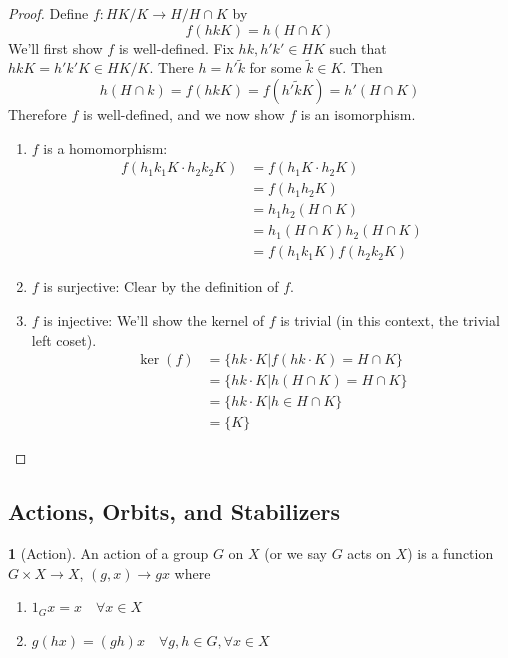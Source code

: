 \documentclass[12pt]{article}
\theoremstyle{definition}
\newtheorem{definition}{\color{NavyBlue}{\textbf{Definition}}}
\theoremstyle{definition}
\begin{document}
\begin{proof}
Define $f : HK / K \to H / H \cap K$ by 
\begin{equation}
	f(hk K) = h (H \cap K)
\end{equation}
We'll first show $f$ is well-defined. Fix $hk, h'k' \in HK$ such that $hk K = h'k'K \in HK/K$. There $h = h'\tilde{k}$ for some $\tilde{k} \in K$. Then
\begin{equation}
	h (H \cap k) = f(hk K) = f(h' \tilde{k} K) = h' (H \cap K)
\end{equation}
Therefore $f$ is well-defined, and we now show $f$ is an isomorphism.
\begin{enumerate}
	\item $f$ is a homomorphism:
	\begin{align*}
	f(h_1 k_1 K \cdot h_2 k_2 K) &= f(h_1 K \cdot h_2 K) \\
	&= f(h_1h_2 K) \\
	&= h_1h_2 (H \cap K) \\
	&= h_1 (H \cap K) h_2 (H \cap K) \\
	&= f(h_1 k_1 K) f(h_2 k_2 K)
	\end{align*}
	\item $f$ is surjective: Clear by the definition of $f$. 
	\item $f$ is injective: We'll show the kernel of $f$ is trivial (in this context, the trivial left coset). 
	\begin{align*}
		\ker(f) &= \{ hk \cdot K | f(hk \cdot K) = H \cap K \} \\
		&= \{ hk \cdot K | h (H \cap K) = H \cap K \} \\
		&= \{ hk \cdot K | h \in H \cap K \} \tag{$h (H\cap K) = H \cap K \iff h \in H\cap K$} \\
		&= \{K \}
	\end{align*}
\end{enumerate}
\end{proof}

\subsection{Actions, Orbits, and Stabilizers}
\begin{definition}[Action]
An action of a group $G$ on $X$ (or we say $G$ acts on $X$) is a function $G \times X \to X$, $(g,x) \to gx$ where
\begin{enumerate}
	\item $1_G x = x \quad \forall x \in X$ 
	\item $g(hx) = (gh)x \quad \forall g,h \in G, \forall x \in X$
\end{enumerate}
\end{definition}
\end{document}
